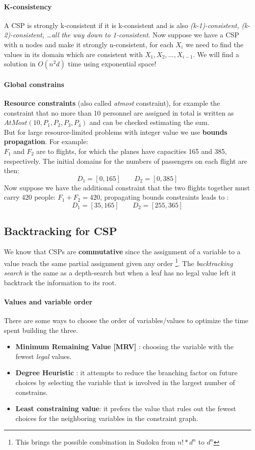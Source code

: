 \documentclass[10pt,a4paper]{article}
\begin{document}
\paragraph{K-consistency}
A CSP is strongly k-consistent if it is k-consistent and is also \textit{(k-1)-consistent, (k-2)-consistent, \dots all the way down to 1-consistent}. Now suppose we have a CSP with n nodes and make it strongly n-consistent, for each $X_i$ we need to find the values in its domain which are consistent with $X_1,X_2,...,X_{i-1}$. We will find a solution in $O(n^2d)$ time using exponential space!

\paragraph{Global constrains}
\textbf{Resource constraints} (also called \textit{atmost} constraint), for example the constraint that no more than 10 personnel are assigned in total is written as $AtMost(10,P_1,P_2,P_3,P_4)$ and can be checked estimating the sum.\\
But for large resource-limited problems with integer value we use \textbf{bounds propagation}. For example:\\
$F_1$ and $F_2$ are to flights, for which the planes have capacities 165 and 385, respectively. The initial domains for the numbers of passengers on each flight are then:
\[D_1=[0,165] \quad \quad D_2=[0,385]\]
Now suppose we have the additional constraint that the two flights together must carry 420 people: $F_1+F_2=420$, propagating bounds constraints leads to :
\[D_1=[35,165] \quad \quad D_2=[255,365]\]

\subsection{Backtracking for CSP}

We know that CSPs are \textbf{commutative} since the assignment of a variable to a value reach the same partial assignment given any order \footnote{This brings the possible combination in Sudoku from $n!*d^n$ to $d^n$}. The \textit{backtracking search } is the same as a depth-search but when a leaf has no legal value left it backtrack the information to its root.

\paragraph{Values and variable order}
There are some ways to choose the order of variables/values to optimize the time spent building the three.
\begin{itemize}
\item \textbf{Minimum Remaining Value [MRV]} : choosing the variable with the fewest \textit{legal} values.
\item \textbf{Degree Heuristic} : it attempts to reduce the branching factor on future choices by  selecting the variable that is involved in the largest number of constrains.
\item \textbf{Least constraining value}: it prefers the value that rules out the fewest choices for the neighboring variables in the constraint graph.
\end{itemize}
\end{document}
